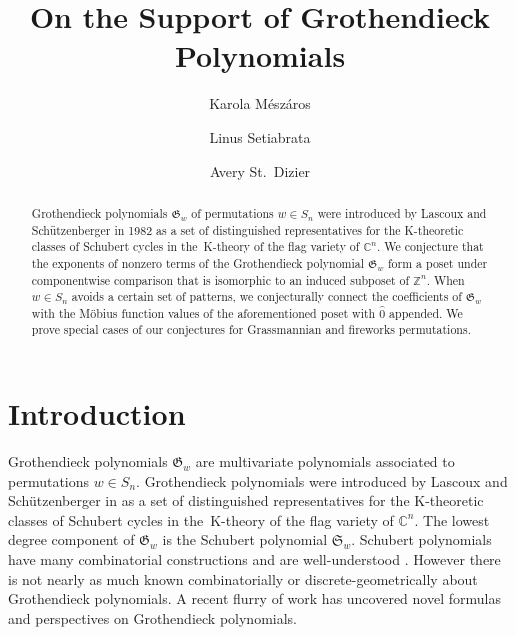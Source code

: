 \documentclass{amsart}
\title{On the Support of Grothendieck Polynomials}
\author{Karola M\'esz\'aros}
\author{Linus Setiabrata}
\author{Avery St.~Dizier}
\theoremstyle{definition}
\theoremstyle{named}
\begin{document}

\begin{abstract}
	Grothendieck polynomials $\mathfrak{G}_w$ of permutations $w\in S_n$ were introduced by Lascoux and Sch\"utzenberger in 1982 as a set of distinguished representatives for the K-theoretic classes of Schubert cycles in the\ K-theory of the flag variety of $\mathbb{C}^n$. We conjecture that the exponents of nonzero terms of the Grothendieck polynomial $\mathfrak{G}_w$ form a poset under componentwise comparison that is isomorphic to an induced subposet 
	of $\mathbb{Z}^n$. When $w\in S_n$ avoids a certain set of patterns, we conjecturally connect the coefficients of $\mathfrak{G}_w$ with the M\"obius function values of the aforementioned poset with $\hat{0}$ appended. We prove special cases of our conjectures for Grassmannian and fireworks permutations.  		
\end{abstract}
	\maketitle
	
	\section{Introduction}
	
	Grothendieck polynomials $\mathfrak{G}_w$ are multivariate polynomials associated to permutations $w\in S_n$. Grothendieck polynomials were introduced by Lascoux and Sch\"utzenberger in \cite{LS2} as a set of distinguished representatives for the K-theoretic classes of Schubert cycles in the\ K-theory of the flag variety of $\mathbb{C}^n$. The lowest degree component of $\mathfrak G_w$ is the Schubert polynomial $\mathfrak S_w$. Schubert polynomials have many combinatorial constructions and are well-understood \cite{laddermoves, BJS, FKschub, nilcoxeter, thomas, lenart, prismtableaux,balancedtableaux,FMS,schlorentzian,schubertgt,schubvertices, inclusionexclusion}. However there is not nearly as much known combinatorially or discrete-geometrically about Grothendieck polynomials. A recent flurry of work \cite{MTY,grothlattice,grothice,grothcoloredlattice,PSW,grothortho,symmgrothnewton} has uncovered novel formulas and perspectives on Grothendieck polynomials.
	
\end{document}
